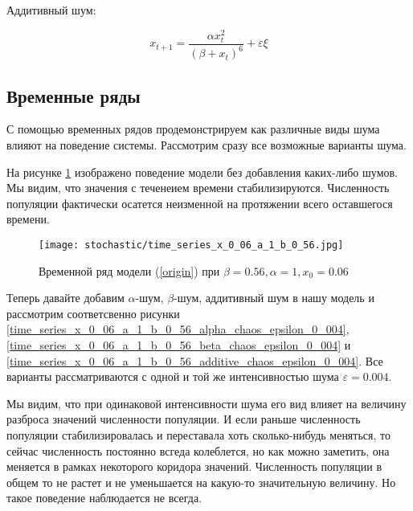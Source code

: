         Аддитивный шум:

        \begin{equation}
            \label{additive_chaos}
            x_{t + 1} = \frac{\alpha x_t^2}{(\beta + x_t)^6} + \varepsilon \xi
        \end{equation}

    \subsection{Временные ряды}

        С помощью временных рядов продемонстрируем как различные виды шума влияют на поведение системы. Рассмотрим сразу все возможные варианты шума. 

        На рисунке \ref{time_series_x_0_06_a_1_b_0_56} изображено поведение модели без добавления каких-либо шумов. Мы видим, что значения с теченеием времени стабилизируются. Численность популяции фактически осатется неизменной на протяжении всего оставшегося времени.

        \begin{figure}
            \centering
            \texttt{[image: stochastic/time\_series\_x\_0\_06\_a\_1\_b\_0\_56.jpg]}

            \captionsetup{justification=centering}
            \caption{Временной ряд модели (\ref{origin}) при \(\beta = 0.56, \alpha = 1, x_0 = 0.06\)}
            \label{time_series_x_0_06_a_1_b_0_56}
        \end{figure}

        Теперь давайте добавим \(\alpha\)-шум, \(\beta\)-шум, аддитивный шум в нашу модель и рассмотрим соответсвенно рисунки \ref{time_series_x_0_06_a_1_b_0_56_alpha_chaos_epsilon_0_004}, \ref{time_series_x_0_06_a_1_b_0_56_beta_chaos_epsilon_0_004} и \ref{time_series_x_0_06_a_1_b_0_56_additive_chaos_epsilon_0_004}. Все варианты рассматриваются с одной и той же интенсивностью шума \(\varepsilon = 0.004\). 
        
        Мы видим, что при одинаковой интенсивности шума его вид влияет на величину разброса значений численности популяции.  И если раньше численность популяции стабилизировалась и переставала хоть сколько-нибудь меняться, то сейчас численность постоянно всгеда колеблется, но как можно заметить, она меняется в рамках некоторого коридора значений. Численность популяции в общем то не растет и не уменьшается на какую-то значительную величину. Но такое поведение наблюдается не всегда.

